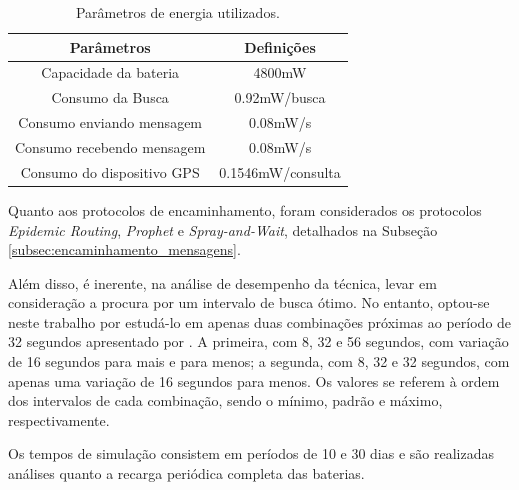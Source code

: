 \begin{table}
\centering
\caption{Parâmetros de energia utilizados.}
\label{consumo_denis_artigo}
\begin{tabular}{|c|c|}
\hline
Parâmetros                   & Definições    \\ \hline
Capacidade da bateria        & 4800mW        \\ \hline
Consumo da Busca             & 0.92mW/busca \\ \hline
Consumo enviando mensagem    & 0.08mW/s\\ \hline
Consumo recebendo mensagem   & 0.08mW/s\\ \hline
Consumo do dispositivo GPS   & 0.1546mW/consulta \\ \hline
\end{tabular}
\end{table}

Quanto aos protocolos de encaminhamento, foram considerados os protocolos \emph{Epidemic Routing}, \emph{Prophet} e \emph{Spray-and-Wait}, detalhados na Subseção \ref{subsec:encaminhamento_mensagens}. 

Além disso, é inerente, na análise de desempenho da técnica, levar em consideração a procura por um intervalo de busca ótimo. No entanto, optou-se neste trabalho por estudá-lo em apenas duas combinações próximas ao período de 32 segundos apresentado por \cite{denis_artigo}. A primeira, com 8, 32 e 56 segundos, com variação de 16 segundos para mais e para menos; a segunda, com 8, 32 e 32 segundos, com apenas uma variação de 16 segundos para menos. Os valores se referem à ordem dos intervalos de cada combinação, sendo o mínimo, padrão e máximo, respectivamente.

Os tempos de simulação consistem em períodos de 10 e 30 dias e são realizadas análises quanto a recarga periódica completa das baterias.